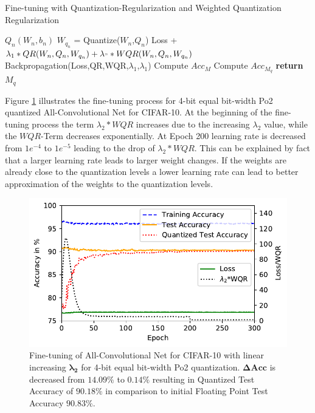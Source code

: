 \begin{algorithm}[ht!]
\caption{Fine-tuning with Quantization-Regularization and Weighted Quantization Regularization}\label{alg:quant}
\begin{algorithmic}
\State 

		 
				
				\State $Q_n(W_n,b_n)$ 	
				\State $W_{q_n}$ = Quantize($W_n$,$Q_n$) 		
			\EndFor
			\State Loss + $\lambda_1*QR(W_n, Q_n, W_{q_n}) + \lambda_"*WQR(W_n, Q_n, W_{q_n})$
			\State Backpropagation(Loss,QR,WQR,$\lambda_1$,$\lambda_1$)		
		\EndFor	
		\State Compute $Acc_{M}$	
		\State Compute $Acc_{M_q}$	
	\EndFor
	\State \textbf{return} $M_q$	
\EndProcedure
\end{algorithmic}
\end{algorithm}


Figure \ref{fig:acc_example} illustrates the fine-tuning process for 4-bit equal bit-width Po2 quantized All-Convolutional Net for CIFAR-10. At the beginning of the fine-tuning process the term $\lambda_2*WQR$ increases due to the increasing $\lambda_2$ value, while the $WQR$-Term decreases exponentially. At Epoch 200 learning rate is decreased from $1e^{-4}$ to $1e^{-5}$ leading to the drop of $\lambda_2*WQR$. This can be explained by fact that a larger learning rate leads to larger weight changes. If the weights are already close to the quantization levels a lower learning rate can lead to better approximation of the weights to the quantization levels.
\begin{figure}[ht!]
\includegraphics[width=\columnwidth]{img/accuracy.pdf}
\caption{Fine-tuning of All-Convolutional Net for CIFAR-10 with linear increasing $\pmb{\lambda}\mathbf{_2}$ for 4-bit equal bit-width Po2 quantization. $\pmb{\Delta}\mathbf{Acc}$ is decreased from $\mathbf{14.09\%}$ to $\mathbf{0.14\%}$ resulting in Quantized Test Accuracy of $\mathbf{90.18\%}$ in comparison to initial Floating Point Test Accuracy $\mathbf{90.83\%}$.}
\label{fig:acc_example}
\end{figure}




